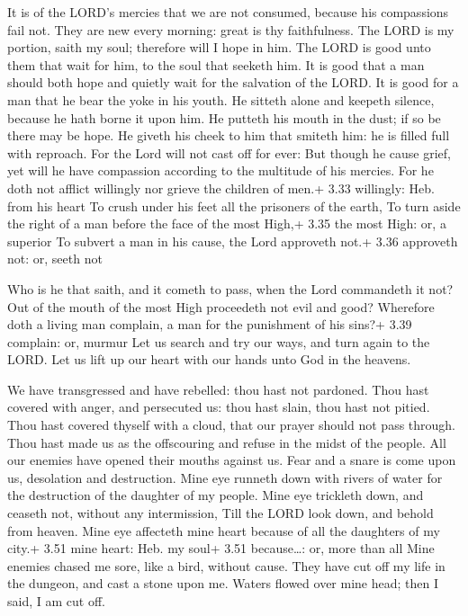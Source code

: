  It is of the LORD's mercies that we are not consumed,
because his compassions fail not.  They are new every
morning: great is thy faithfulness.  The LORD is my
portion, saith my soul; therefore will I hope in him.  The
LORD is good unto them that wait for him, to the soul that seeketh him.
 It is good that a man should both hope and quietly wait
for the salvation of the LORD.  It is good for a man that
he bear the yoke in his youth.  He sitteth alone and
keepeth silence, because he hath borne it upon him.  He
putteth his mouth in the dust; if so be there may be hope. 
He giveth his cheek to him that smiteth him: he is filled full with
reproach.  For the Lord will not cast off for ever:
 But though he cause grief, yet will he have compassion
according to the multitude of his mercies.  For he doth not
afflict willingly nor grieve the children of men.+ 3.33 willingly: Heb.
from his heart  To crush under his feet all the prisoners
of the earth,  To turn aside the right of a man before the
face of the most High,+ 3.35 the most High: or, a superior 
To subvert a man in his cause, the Lord approveth not.+ 3.36 approveth
not: or, seeth not

 Who is he that saith, and it cometh to pass, when the
Lord commandeth it not?  Out of the mouth of the most High
proceedeth not evil and good?  Wherefore doth a living man
complain, a man for the punishment of his sins?+ 3.39 complain: or,
murmur  Let us search and try our ways, and turn again to
the LORD.  Let us lift up our heart with our hands unto God
in the heavens.

 We have transgressed and have rebelled: thou hast not
pardoned.  Thou hast covered with anger, and persecuted us:
thou hast slain, thou hast not pitied.  Thou hast covered
thyself with a cloud, that our prayer should not pass through.
 Thou hast made us as the offscouring and refuse in the
midst of the people.  All our enemies have opened their
mouths against us.  Fear and a snare is come upon us,
desolation and destruction.  Mine eye runneth down with
rivers of water for the destruction of the daughter of my people.
 Mine eye trickleth down, and ceaseth not, without any
intermission,  Till the LORD look down, and behold from
heaven.  Mine eye affecteth mine heart because of all the
daughters of my city.+ 3.51 mine heart: Heb. my soul+ 3.51
because\ldots: or, more than all  Mine enemies chased me
sore, like a bird, without cause.  They have cut off my
life in the dungeon, and cast a stone upon me.  Waters
flowed over mine head; then I said, I am cut off.

